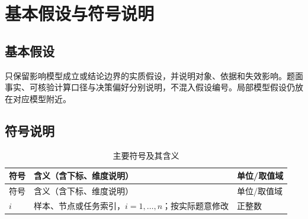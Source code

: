 \section{基本假设与符号说明}

\subsection{基本假设}
只保留影响模型成立或结论边界的实质假设，并说明对象、依据和失效影响。题面事实、可核验计算口径与决策偏好分别说明，不混入假设编号。局部模型假设仍放在对应模型附近。

\subsection{符号说明}
\begin{longtable}{@{}p{}p{}p{}@{}}
\caption{主要符号及其含义}\label{tab:symbols}\\
\toprule
符号 & 含义（含下标、维度说明） & 单位/取值域 \\
\midrule
\endfirsthead
\toprule
符号 & 含义（含下标、维度说明） & 单位/取值域 \\
\midrule
\endhead
\bottomrule
\endfoot
$i$ & 样本、节点或任务索引，$i=1,\ldots,n$；按实际题意修改 & 正整数 \\
\end{longtable}
